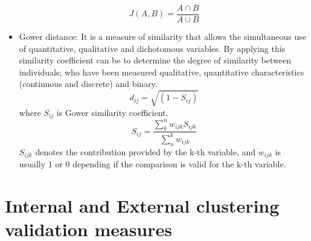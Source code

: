 \begin{itemize}
    \begin{equation}
        J(A,B) = \frac{A \cap B}{A \cup B}
    \end{equation}
    \item Gower distance: It is a measure of similarity that allows the simultaneous use of quantitative, qualitative and dichotomous variables. By applying this similarity coefficient can be to determine the degree of similarity between individuals; who have been measured qualitative, quantitative characteristics (continuous and discrete) and binary.
    \begin{equation}
        d_{ij}=\sqrt{(1-S_{ij})}
    \end{equation}
    where $S_{ij}$ is Gower similarity coefficient.
    \begin{equation}
        S_{ij}=\frac{\sum_{k}^{n}w_{ijk}S_{ijk}}{\sum_{n}^{k}w_{ijk}}
    \end{equation}
    $S_{ijk}$ denotes the contribution provided by the k-th variable, and $w_{ijk}$ is usually 1 or 0 depending if the comparison is valid for the k-th variable.
\end{itemize}

\section {Internal and External clustering validation measures} \label{sec:seccion2}

